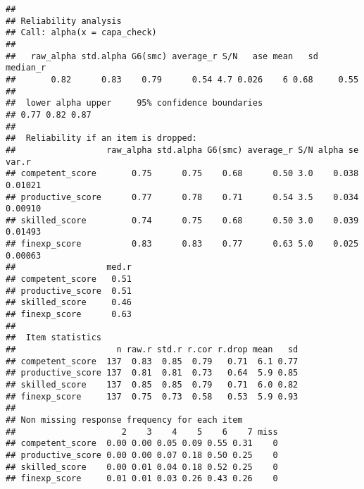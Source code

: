 \documentclass[]{article}
\newenvironment{Shaded}{\begin{snugshade}}{\end{snugshade}}
\newcommand{\CommentTok}[1]{\textcolor[rgb]{0.56,0.35,0.01}{\textit{#1}}}
\newcommand{\DataTypeTok}[1]{\textcolor[rgb]{0.13,0.29,0.53}{#1}}
\newcommand{\DecValTok}[1]{\textcolor[rgb]{0.00,0.00,0.81}{#1}}
\newcommand{\KeywordTok}[1]{\textcolor[rgb]{0.13,0.29,0.53}{\textbf{#1}}}
\newcommand{\NormalTok}[1]{#1}
\newcommand{\OperatorTok}[1]{\textcolor[rgb]{0.81,0.36,0.00}{\textbf{#1}}}
\newcommand{\StringTok}[1]{\textcolor[rgb]{0.31,0.60,0.02}{#1}}
\begin{document}
\begin{verbatim}
## 
## Reliability analysis   
## Call: alpha(x = capa_check)
## 
##   raw_alpha std.alpha G6(smc) average_r S/N   ase mean   sd median_r
##       0.82      0.83    0.79      0.54 4.7 0.026    6 0.68     0.55
## 
##  lower alpha upper     95% confidence boundaries
## 0.77 0.82 0.87 
## 
##  Reliability if an item is dropped:
##                  raw_alpha std.alpha G6(smc) average_r S/N alpha se   var.r
## competent_score       0.75      0.75    0.68      0.50 3.0    0.038 0.01021
## productive_score      0.77      0.78    0.71      0.54 3.5    0.034 0.00910
## skilled_score         0.74      0.75    0.68      0.50 3.0    0.039 0.01493
## finexp_score          0.83      0.83    0.77      0.63 5.0    0.025 0.00063
##                  med.r
## competent_score   0.51
## productive_score  0.51
## skilled_score     0.46
## finexp_score      0.63
## 
##  Item statistics 
##                    n raw.r std.r r.cor r.drop mean   sd
## competent_score  137  0.83  0.85  0.79   0.71  6.1 0.77
## productive_score 137  0.81  0.81  0.73   0.64  5.9 0.85
## skilled_score    137  0.85  0.85  0.79   0.71  6.0 0.82
## finexp_score     137  0.75  0.73  0.58   0.53  5.9 0.93
## 
## Non missing response frequency for each item
##                     2    3    4    5    6    7 miss
## competent_score  0.00 0.00 0.05 0.09 0.55 0.31    0
## productive_score 0.00 0.00 0.07 0.18 0.50 0.25    0
## skilled_score    0.00 0.01 0.04 0.18 0.52 0.25    0
## finexp_score     0.01 0.01 0.03 0.26 0.43 0.26    0
\end{verbatim}

\begin{Shaded}
\end{Shaded}
\end{document}
